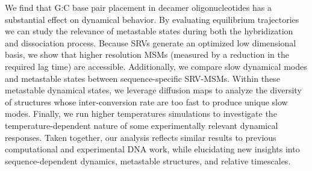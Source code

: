 \documentclass[journal=jpcbfk,manuscript=article]{achemso}
\begin{document}
We find that G:C base pair placement in decamer oligonucleotides has a substantial effect on dynamical behavior. By evaluating equilibrium trajectories we can study the relevance of metastable states during both the hybridization and dissociation process. Because SRVs generate an optimized low dimensional basis, we show that higher resolution MSMs (measured by a reduction in the required lag time) are accessible. Additionally, we compare slow dynamical modes and metastable states between sequence-specific SRV-MSMs. Within these metastable dynamical states, we leverage diffusion maps to analyze the diversity of structures whose inter-conversion rate are too fast to produce unique slow modes. Finally, we run higher temperatures simulations to investigate the temperature-dependent nature of some experimentally relevant dynamical responses. Taken together, our analysis reflects similar results to previous computational and experimental DNA work, while elucidating new insights into sequence-dependent dynamics, metastable structures, and relative timescales. 




\end{document}

